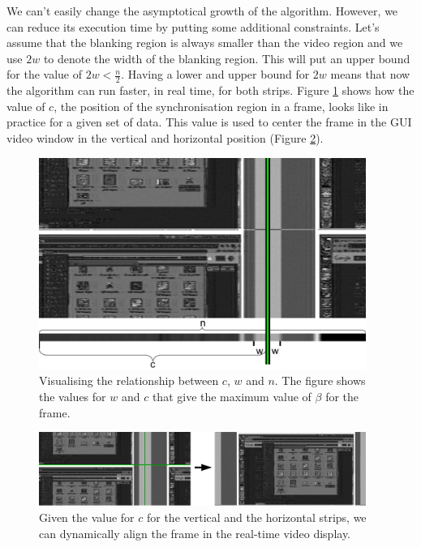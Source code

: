 \documentclass[a4paper,12pt,twoside,openright]{report}
\begin{document}
We can't easily change the asymptotical growth of the algorithm. However, we can reduce its execution time by putting some additional constraints. Let's assume that the blanking region is always smaller than the video region and we use $2w$ to denote the width of the blanking region. This will put an upper bound for the value of $2w < \frac{n}{2}$. Having a lower and upper bound for $2w$ means that now the algorithm can run faster, in real time, for both strips. Figure \ref{fig:syncexplained} shows how the value of $c$, the position of the synchronisation region in a frame, looks like in practice for a given set of data. This value is used to center the frame in the GUI video window in the vertical and horizontal position (Figure \ref{fig:syncalligned}).

\begin{figure}[h]
\centering
\includegraphics[width=0.95\textwidth]{detectionexplained}
\caption{Visualising the relationship between $c$, $w$ and $n$. The figure shows the values for $w$ and $c$ that give the maximum value of $\beta$ for the frame.}
\label{fig:syncexplained}
\end{figure}

\begin{figure}[h]
\centering
\includegraphics[width=0.95\textwidth]{frame_sync}
\caption{Given the value for $c$ for the vertical and the horizontal strips, we can dynamically align the frame in the real-time video display.}
\label{fig:syncalligned}
\end{figure}
\end{document}
